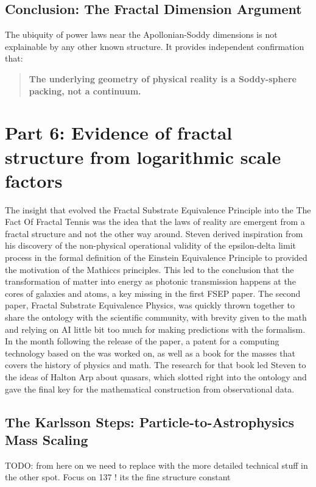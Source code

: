 \documentclass[11pt,a4paper]{article}
\begin{document}
\subsection{Conclusion: The Fractal Dimension Argument}

The ubiquity of power laws near the Apollonian-Soddy dimensions is not explainable by any other known structure. It provides independent confirmation that:

\begin{quote}
\textbf{The underlying geometry of physical reality is a Soddy-sphere packing, not a continuum.}
\end{quote}


\section{Part 6: Evidence of fractal structure from logarithmic scale factors}


The insight that evolved the Fractal Substrate Equivalence Principle into the The Fact Of Fractal Tennis was the idea that the laws of reality are emergent from a fractal structure and not the other way around. Steven derived inspiration from his discovery of the non-physical operational validity of the epsilon-delta limit process in the formal definition of the Einstein Equivalence Principle to provided the motivation of the Mathiccs principles. This led to the conclusion that the transformation of matter into energy as photonic transmission happens at the cores of galaxies and atoms, a key missing in the first FSEP paper. The second paper, Fractal Substrate Equivalence Physics, was quickly thrown together to share the ontology with the scientific community, with brevity given to the math and relying on AI little bit too much for making predictions with the formalism. In the month following the release of the paper, a patent for a computing technology based on the was worked on, as well as a book for the masses that covers the history of physics and math. The research for that book led Steven to the ideas of Halton Arp about quasars, which slotted right into the ontology and gave the final key for the mathematical construction from observational data.

\subsection{The Karlsson Steps: Particle-to-Astrophysics Mass Scaling}

TODO: from here on we need to replace with the more detailed technical stuff in the other spot. Focus on 137 ! its the fine structure constant
\end{document}
